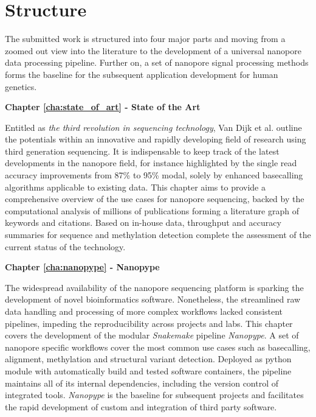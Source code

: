 \section{Structure}
\label{sec:intro:structure}

The submitted work is structured into four major parts and moving from a zoomed out view into the literature to the development of a universal nanopore data processing pipeline. 
Further on, a set of nanopore signal processing methods forms the baseline for the subsequent application development for human genetics.

\textbf{Chapter \ref{cha:state_of_art} - State of the Art} %

Entitled as \textit{the third revolution in sequencing technology}, Van Dijk et al. \cite{Dijk2018} outline the potentials within an innovative and rapidly developing field of research using third generation sequencing.
It is indispensable to keep track of the latest developments in the nanopore field, for instance highlighted by the single read accuracy improvements from 87\% to 95\% modal, solely by enhanced basecalling algorithms applicable to existing data.
This chapter aims to provide a comprehensive overview of the use cases for nanopore sequencing, backed by the computational analysis of millions of publications forming a literature graph of keywords and citations.
Based on in-house data, throughput and accuracy summaries for sequence and methylation detection complete the assessment of the current status of the technology.


\textbf{Chapter \ref{cha:nanopype} - Nanopype}

The widespread availability of the nanopore sequencing platform is sparking the development of novel bioinformatics software.
Nonetheless, the streamlined raw data handling and processing of more complex workflows lacked consistent pipelines, impeding the reproducibility across projects and labs.
This chapter covers the development of the modular \textit{Snakemake} pipeline \textit{Nanopype}.
A set of nanopore specific workflows cover the most common use cases such as basecalling, alignment, methylation and structural variant detection.
Deployed as python module with automatically build and tested software containers, the pipeline maintains all of its internal dependencies, including the version control of integrated tools.
\textit{Nanopype} is the baseline for subsequent projects and facilitates the rapid development of custom and integration of third party software.


